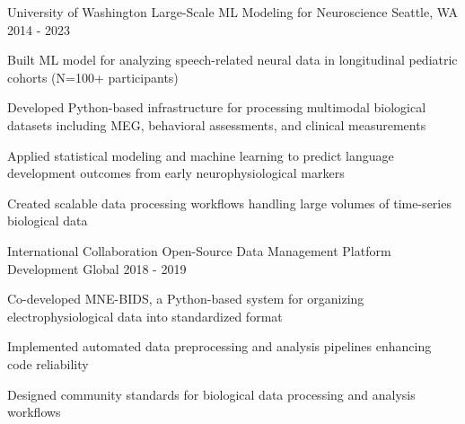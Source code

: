 

\begin{cventries}
    \cventry
      {University of Washington} %
      {Large-Scale ML Modeling for Neuroscience} %
      {Seattle, WA} %
      {2014 - 2023} %
      {
        \begin{cvitems} %
          \item {Built ML model for analyzing speech-related neural data in longitudinal pediatric cohorts (N=100+ participants)}
          \item {Developed Python-based infrastructure for processing multimodal biological datasets including MEG, behavioral assessments, and clinical measurements}
          \item {Applied statistical modeling and machine learning to predict language development outcomes from early neurophysiological markers}
          \item {Created scalable data processing workflows handling large volumes of time-series biological data}
        \end{cvitems}
      }

    \cventry
      {International Collaboration} %
      {Open-Source Data Management Platform Development} %
      {Global} %
      {2018 - 2019} %
      {
        \begin{cvitems} %
          \item {Co-developed MNE-BIDS, a Python-based system for organizing electrophysiological data into standardized format}
          \item {Implemented automated data preprocessing and analysis pipelines enhancing code reliability}
          \item {Designed community standards for biological data processing and analysis workflows}
        \end{cvitems}
      }


\end{cventries}
